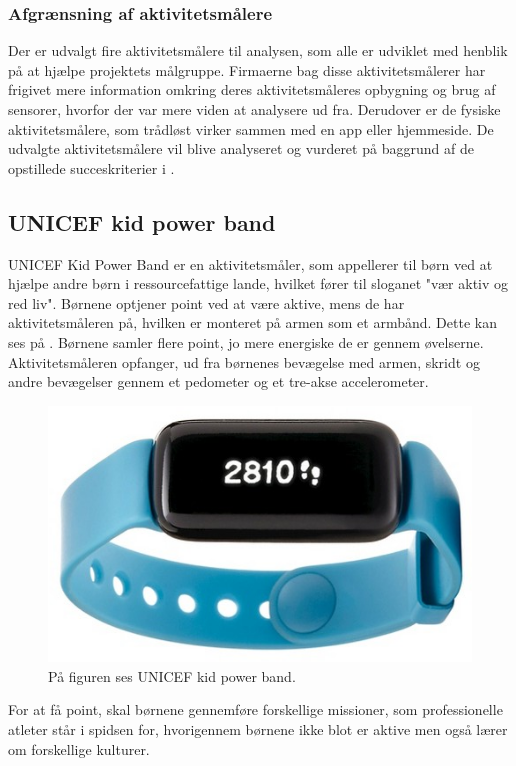 \subsubsection{Afgrænsning af aktivitetsmålere}  %
Der er udvalgt fire aktivitetsmålere til analysen, som alle er udviklet med henblik på at hjælpe projektets målgruppe. Firmaerne bag disse aktivitetsmålerer har frigivet mere information omkring deres aktivitetsmåleres opbygning og brug af sensorer, hvorfor der var mere viden at analysere ud fra. Derudover er de fysiske aktivitetsmålere, som trådløst virker sammen med en app eller hjemmeside. De udvalgte aktivitetsmålere vil blive analyseret og vurderet på baggrund af de opstillede succeskriterier i .

\subsection{UNICEF kid power band}
UNICEF Kid Power Band er en aktivitetsmåler, som appellerer til børn ved at hjælpe andre børn i ressourcefattige lande, hvilket fører til sloganet "vær aktiv og red liv". Børnene optjener point ved at være aktive, mens de har aktivitetsmåleren på, hvilken er monteret på armen som et armbånd. Dette kan ses på . Børnene samler flere point, jo mere energiske de er gennem øvelserne.
Aktivitetsmåleren opfanger, ud fra børnenes bevægelse med armen, skridt og andre bevægelser gennem et pedometer og et tre-akse accelerometer. \citep{PowerAbout2015,PowerManual2015}
\begin{figure}[H]
	\centering
	\includegraphics[scale=0.9]{figures/aProblemanalyse/unicef.png}
	\caption{På figuren ses UNICEF kid power band. \cite{Unicef2016}}
	\label{fig:unicef}
\end{figure}
For at få point, skal børnene gennemføre forskellige missioner, som professionelle atleter står i spidsen for, hvorigennem børnene ikke blot er aktive men også lærer om forskellige kulturer. \citep{PowerMission2015} 
